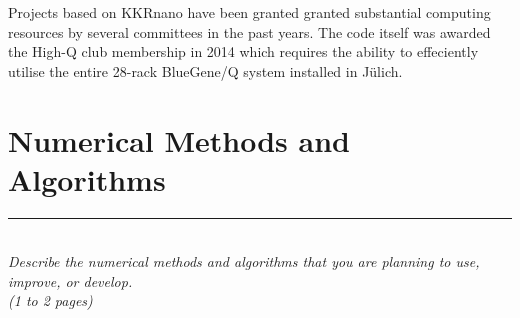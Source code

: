 \documentclass [a4paper, 12pt]{article}
\begin{document}
Projects based on KKRnano have been granted
granted substantial computing resources by several committees in the past years.
The code itself was awarded the High-Q club membership in 2014 which requires the ability to
effeciently utilise the entire 28-rack BlueGene/Q system installed in Jülich.




\section{Numerical Methods and Algorithms} 
\rule{\textwidth}{0.4pt}\\
\textit{Describe the numerical methods and algorithms that you are planning to use, improve, or develop.}\\
 
\textit{(1 to 2 pages)}
\bigskip
\end{document}
